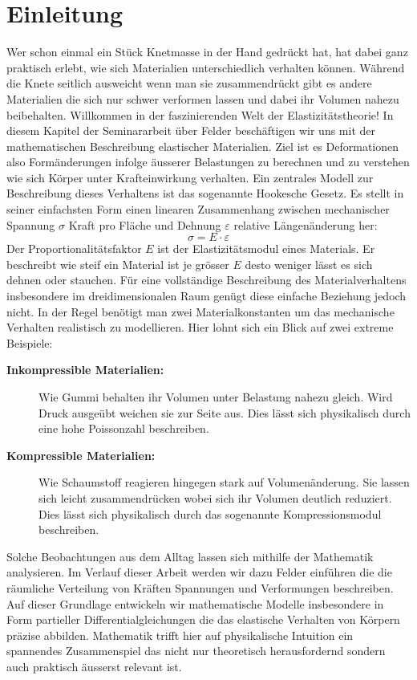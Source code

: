 %
%
%
%
\section{Einleitung}
\label{elastomechanik:section:Einleitung}
Wer schon einmal ein Stück Knetmasse in der Hand gedrückt hat, hat dabei ganz praktisch erlebt, wie sich Materialien unterschiedlich verhalten können. 
Während die Knete seitlich ausweicht wenn man sie zusammendrückt gibt es andere Materialien die sich nur schwer verformen lassen und dabei ihr Volumen nahezu beibehalten. 
Willkommen in der faszinierenden Welt der Elastizitätstheorie!
In diesem Kapitel der Seminararbeit über Felder beschäftigen wir uns mit der mathematischen Beschreibung elastischer Materialien.
Ziel ist es Deformationen also Formänderungen infolge äusserer Belastungen zu berechnen und zu verstehen wie sich Körper unter Krafteinwirkung verhalten.
Ein zentrales Modell zur Beschreibung dieses Verhaltens ist das sogenannte Hookesche Gesetz.
Es stellt in seiner einfachsten Form einen linearen Zusammenhang zwischen mechanischer Spannung $\sigma$ Kraft pro Fläche und Dehnung $\varepsilon$ relative Längenänderung her:
	\begin{equation}
		\sigma = 
		E \cdot \varepsilon
	\end{equation}
Der Proportionalitätsfaktor $E$ ist der Elastizitätsmodul eines Materials.
Er beschreibt wie steif ein Material ist je grösser $E$ desto weniger lässt es sich dehnen oder stauchen.
Für eine vollständige Beschreibung des Materialverhaltens insbesondere im dreidimensionalen Raum genügt diese einfache Beziehung jedoch nicht.
In der Regel benötigt man zwei Materialkonstanten um das mechanische Verhalten realistisch zu modellieren.
Hier lohnt sich ein Blick auf zwei extreme Beispiele:
\begin{description}
\item[\textbf{Inkompressible Materialien:}] Wie Gummi behalten ihr Volumen unter Belastung nahezu gleich.
Wird Druck ausgeübt weichen sie zur Seite aus.
Dies lässt sich physikalisch durch eine hohe Poissonzahl beschreiben.
\item[\textbf{Kompressible Materialien:}]  Wie Schaumstoff reagieren hingegen stark auf Volumenänderung.
Sie lassen sich leicht zusammendrücken wobei sich ihr Volumen deutlich reduziert.
Dies lässt sich physikalisch durch das sogenannte Kompressionsmodul beschreiben.
\end{description}

Solche Beobachtungen aus dem Alltag lassen sich mithilfe der Mathematik analysieren.
Im Verlauf dieser Arbeit werden wir dazu Felder einführen die die räumliche Verteilung von Kräften Spannungen und Verformungen beschreiben.
Auf dieser Grundlage entwickeln wir mathematische Modelle insbesondere in Form partieller Differentialgleichungen die das elastische Verhalten von Körpern präzise abbilden.
Mathematik trifft hier auf physikalische Intuition ein spannendes Zusammenspiel das nicht nur theoretisch herausfordernd sondern auch praktisch äusserst relevant ist.